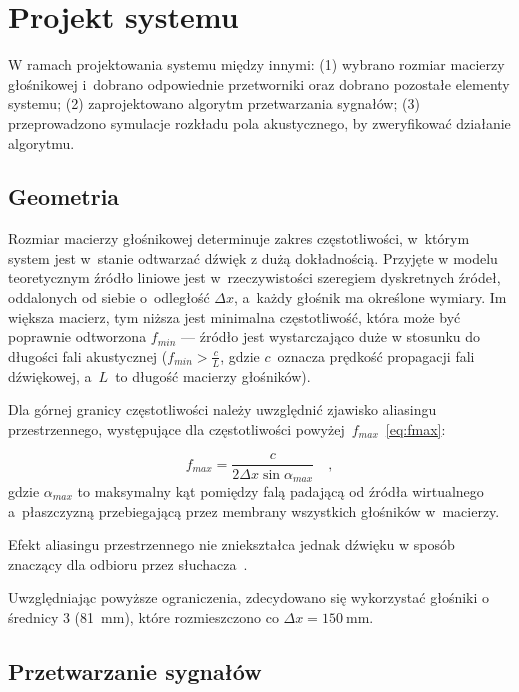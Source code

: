 \documentclass[10pt, a4paper]{article}
\let\Oldsection\section
\renewcommand{\section}{\FloatBarrier\Oldsection}
\let\Oldsubsection\subsection
\renewcommand{\subsection}{\FloatBarrier\Oldsubsection}
\begin{document}
\section{Projekt systemu}

W ramach projektowania systemu między innymi: (1) wybrano rozmiar macierzy
głośnikowej i~dobrano odpowiednie przetworniki oraz dobrano pozostałe elementy
systemu; (2) zaprojektowano algorytm przetwarzania sygnałów; (3) przeprowadzono
symulacje rozkładu pola akustycznego, by zweryfikować działanie algorytmu.

\subsection{Geometria}

Rozmiar macierzy głośnikowej determinuje zakres częstotliwości, w~którym system
jest w~stanie odtwarzać dźwięk z dużą dokładnością. Przyjęte w modelu teoretycznym 
źródło liniowe jest w~rzeczywistości szeregiem dyskretnych źródeł, oddalonych od siebie 
o~odległość $\Delta x$, a~każdy głośnik ma określone wymiary. Im większa macierz, tym niższa
jest minimalna częstotliwość, która może być poprawnie odtworzona $f_{min}$ --- źródło jest wystarczająco duże w stosunku 
do długości fali akustycznej ($f_{min}>\frac{c}{L}$, gdzie $c$~oznacza prędkość propagacji fali dźwiękowej,
a~$L$~to długość macierzy głośników).

Dla górnej granicy częstotliwości należy uwzględnić zjawisko aliasingu
przestrzennego, występujące dla częstotliwości powyżej~$f_{max}$~\eqref{eq:fmax}:

\begin{equation}
  f_{max}=\frac{c}{2\Delta x \sin{\alpha_{max}}} \quad, \label{eq:fmax}
\end{equation}
gdzie $\alpha_{max}$ to maksymalny kąt pomiędzy falą padającą od źródła 
wirtualnego a~płaszczyzną przebiegającą przez membrany wszystkich głośników w~macierzy.

Efekt aliasingu przestrzennego nie zniekształca jednak dźwięku w sposób znaczący dla odbioru przez 
słuchacza~\cite{hq_rendering}.

Uwzględniając powyższe ograniczenia, zdecydowano się wykorzystać głośniki o średnicy \SI{3}{\inch}
(\SI{81}{\milli\meter}), które rozmieszczono co $\Delta x=\SI{150}{\milli\meter}$.

\subsection{Przetwarzanie sygnałów}\label{s:algorithm}
\end{document}
